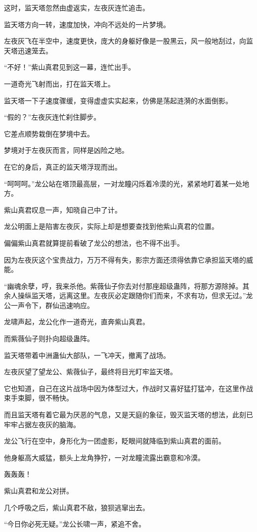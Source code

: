 \begin{this_body}
这时，监天塔忽然由虚返实，左夜灰连忙追击。

监天塔方向一转，速度加快，冲向不远处的一片梦境。

左夜灰飞在半空中，速度更快，庞大的身躯好像是一股黑云，风一般地刮过，向监天塔迅速笼去。

“不好！”紫山真君见到这一幕，连忙出手。

一道奇光飞射而出，打在监天塔上。

监天塔一下子速度骤缓，变得虚虚实实起来，仿佛是荡起涟漪的水面倒影。

“假的？”左夜灰连忙刹住脚步。

它差点顺势栽倒在梦境中去。

梦境对于左夜灰而言，同样是凶险之地。

在它的身后，真正的监天塔浮现而出。

“呵呵呵。”龙公站在塔顶最高层，一对龙瞳闪烁着冷漠的光，紧紧地盯着某一处地方。

紫山真君叹息一声，知晓自己中了计。

龙公明面上是陷害左夜灰，实际上却是想要查找到他紫山真君的位置。

偏偏紫山真君就算提前看破了龙公的想法，也不得不出手。

因为左夜灰这个宝贵战力，万万不得有失，影宗方面还须得依靠它承担监天塔的威能。

“幽魂余孽，哼，我来杀他。紫薇仙子你去对付那座超级蛊阵，将那方源除掉。其余人操纵监天塔，远离这里。左夜灰必定跟随你们而来，不求有功，但求无过。”龙公一声令下，群仙迅速响应。

龙啸声起，龙公化作一道奇光，直奔紫山真君。

而紫薇仙子则扑向超级蛊阵。

监天塔带着中洲蛊仙大部队，一飞冲天，撤离了战场。

左夜灰望了望龙公、紫薇仙子，最终将目光盯牢监天塔。

它也知道，自己在这片战场中因为体型过大，作战时又喜好猛打猛冲，在这里作战束手束脚，很不畅快。

而且监天塔有着它最为厌恶的气息，又是天庭的象征，毁灭监天塔的想法，此刻已牢牢占据左夜灰的脑海。

龙公飞行在空中，身形化为一团虚影，眨眼间就降临到紫山真君的面前。

他身躯高大威猛，额头上龙角狰狞，一对龙瞳流露出霸意和冷漠。

轰轰轰！

紫山真君和龙公对拼。

几个呼吸之后，紫山真君不敌，狼狈逃窜出去。

“今日你必死无疑。”龙公长啸一声，紧追不舍。


\end{this_body}
